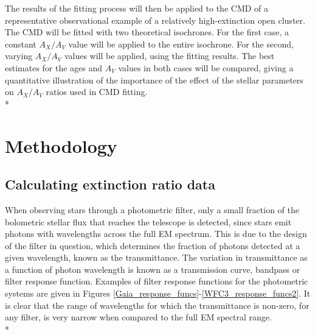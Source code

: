 \documentclass[12pt, a4paper]{report}
\begin{document}


The results of the fitting process will then be applied to the CMD of a representative observational example of a relatively high-extinction open cluster. The CMD will be fitted with two theoretical isochrones. For the first case, a constant $A_{X}/A_{V}$ value will be applied to the entire isochrone. For the second, varying $A_{X}/A_{V}$ values will be applied, using the fitting results. The best estimates for the ages and $A_{V}$ values in both cases will be compared, giving a quantitative illustration of the importance of the effect of the stellar parameters on $A_{X}/A_{V}$ ratios used in CMD fitting.\\*



\chapter{Methodology}

\section{Calculating extinction ratio data}

When observing stars through a photometric filter, only a small fraction of the bolometric stellar flux that reaches the telescope is detected, since stars emit photons with wavelengths across the full EM spectrum. This is due to the design of the filter in question, which determines the fraction of photons detected at a given wavelength, known as the transmittance. The variation in transmittance as a function of photon wavelength is known as a transmission curve, bandpass or filter response function. Examples of filter response functions for the photometric systems are given in Figures \ref{Gaia_response_funcs}-\ref{WFC3_response_funcs2}. It is clear that the range of wavelengths for which the transmittance is non-zero, for any filter, is very narrow when compared to the full EM spectral range.\\* 
\end{document}
